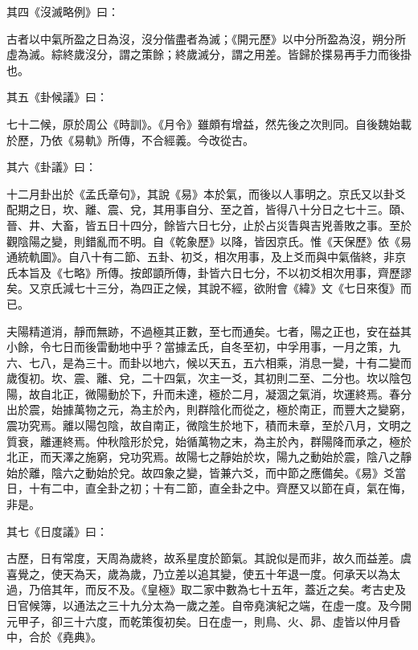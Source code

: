 \begin{pinyinscope}
 其四《沒滅略例》曰：



 古者以中氣所盈之日為沒，沒分偕盡者為滅；《開元歷》以中分所盈為沒，朔分所虛為滅。綜終歲沒分，謂之策餘；終歲滅分，謂之用差。皆歸於揲易再手力而後掛也。



 其五《卦候議》曰：



 七十二候，原於周公《時訓》。《月令》雖頗有增益，然先後之次則同。自後魏始載於歷，乃依《易軌》所傳，不合經義。今改從古。



 其六《卦議》曰：



 十二月卦出於《孟氏章句》，其說《易》本於氣，而後以人事明之。京氏又以卦爻配期之日，坎、離、震、兌，其用事自分、至之首，皆得八十分日之七十三。頤、晉、井、大畜，皆五日十四分，餘皆六日七分，止於占災眚與吉兇善敗之事。至於觀陰陽之變，則錯亂而不明。自《乾象歷》以降，皆因京氏。惟《天保歷》依《易通統軌圖》。自八十有二節、五卦、初爻，相次用事，及上爻而與中氣偕終，非京氏本旨及《七略》所傳。按郎顗所傳，卦皆六日七分，不以初爻相次用事，齊歷謬矣。又京氏減七十三分，為四正之候，其說不經，欲附會《緯》文《七日來復》而已。



 夫陽精道消，靜而無跡，不過極其正數，至七而通矣。七者，陽之正也，安在益其小餘，令七日而後雷動地中乎？當據孟氏，自冬至初，中孚用事，一月之策，九六、七八，是為三十。而卦以地六，候以天五，五六相乘，消息一變，十有二變而歲復初。坎、震、離、兌，二十四氣，次主一爻，其初則二至、二分也。坎以陰包陽，故自北正，微陽動於下，升而未達，極於二月，凝涸之氣消，坎運終焉。春分出於震，始據萬物之元，為主於內，則群陰化而從之，極於南正，而豐大之變窮，震功究焉。離以陽包陰，故自南正，微陰生於地下，積而未章，至於八月，文明之質衰，離運終焉。仲秋陰形於兌，始循萬物之末，為主於內，群陽降而承之，極於北正，而天澤之施窮，兌功究焉。故陽七之靜始於坎，陽九之動始於震，陰八之靜始於離，陰六之動始於兌。故四象之變，皆兼六爻，而中節之應備矣。《易》爻當日，十有二中，直全卦之初；十有二節，直全卦之中。齊歷又以節在貞，氣在悔，非是。



 其七《日度議》曰：



 古歷，日有常度，天周為歲終，故系星度於節氣。其說似是而非，故久而益差。虞喜覺之，使天為天，歲為歲，乃立差以追其變，使五十年退一度。何承天以為太過，乃倍其年，而反不及。《皇極》取二家中數為七十五年，蓋近之矣。考古史及日官候簿，以通法之三十九分太為一歲之差。自帝堯演紀之端，在虛一度。及今開元甲子，卻三十六度，而乾策復初矣。日在虛一，則鳥、火、昴、虛皆以仲月昏中，合於《堯典》。




\end{pinyinscope}
